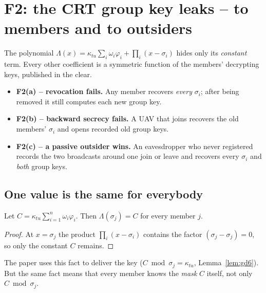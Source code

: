 \chapter{F2: the CRT group key leaks -- to members and to outsiders}\label{ch:f2}
\begin{flawbox}[title={Flaw F2 -- the broadcast polynomial reveals the decrypting keys}]
The polynomial $\Lambda(x)=\kappa_{tu}\sum_i\omega_i\varphi_i+\prod_i(x-\sigma_i)$ hides only its \emph{constant} term. Every other coefficient is a
symmetric function of the members' decrypting keys, published in the clear.
\begin{itemize}[leftmargin=*]
\item \textbf{F2(a) -- revocation fails.} Any member recovers \emph{every} $\sigma_i$; after being removed it still computes each new group key.
\item \textbf{F2(b) -- backward secrecy fails.} A UAV that joins recovers the old members' $\sigma_i$ and opens recorded old group keys.
\item \textbf{F2(c) -- a passive outsider wins.} An eavesdropper who never registered records the two broadcasts around one join or leave and recovers
every $\sigma_i$ and \emph{both} group keys.
\end{itemize}
\end{flawbox}

\section{One value is the same for everybody}
\begin{lemma}\label{lem:common}
Let $C=\kappa_{tu}\sum_{i=1}^n\omega_i\varphi_i$. Then $\Lambda(\sigma_j)=C$ for every member $j$.
\end{lemma}
\begin{proof}
At $x=\sigma_j$ the product $\prod_i(x-\sigma_i)$ contains the factor $(\sigma_j-\sigma_j)=0$, so only the constant $C$ remains.
\end{proof}
\noindent The paper uses this fact to deliver the key ($C\bmod\sigma_j=\kappa_{tu}$, Lemma~\ref{lem:gd6}). But the same fact means that every member
knows the \emph{mask} $C$ itself, not only $C\bmod\sigma_j$.

